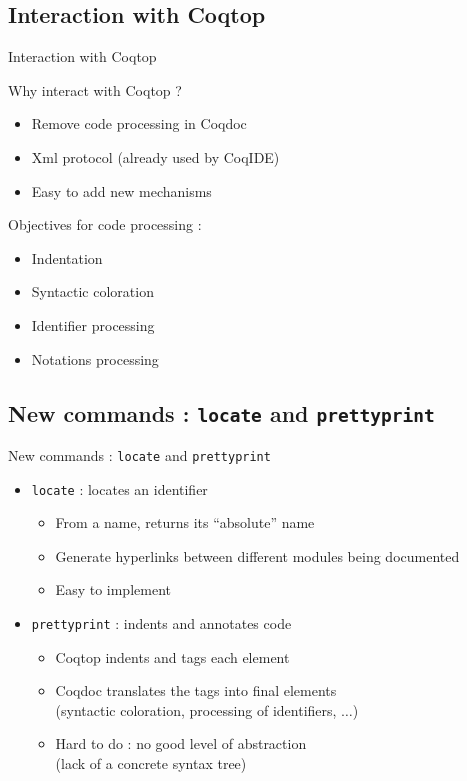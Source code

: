 \documentclass[compress]{beamer}
\newenvironment{tframe}[1]{
  \subsection{#1}
  \begin{frame}{#1}
  }{
  \end{frame}
  }
\begin{document}
  \begin{tframe}{Interaction with Coqtop}
    Why interact with Coqtop ?
    \begin{itemize}
      \item Remove code processing in Coqdoc
      \item Xml protocol (already used by CoqIDE)
      \item Easy to add new mechanisms
    \end{itemize}
    \vfill
    Objectives for code processing :
    \begin{itemize}
      \item Indentation
      \item Syntactic coloration
      \item Identifier processing
      \item Notations processing %
    \end{itemize}
  \end{tframe}

  \begin{tframe}{New commands : \texttt{locate} and \texttt{prettyprint}}
    \begin{itemize}
      \item \texttt{locate} : locates an identifier
        \begin{itemize}
          \item From a name, returns its ``absolute'' name
          \item Generate hyperlinks between different modules being documented
          \item Easy to implement
        \end{itemize}
        \vfill
      \item \texttt{prettyprint} : indents and annotates code
        \begin{itemize}
          \item Coqtop indents and tags each element
          \item Coqdoc translates the tags into final elements \\
            \small (syntactic coloration, processing of identifiers, $\ldots$)
          \item Hard to do : no good level of abstraction \\
            \small (lack of a concrete syntax tree)
        \end{itemize}
    \end{itemize}
  \end{tframe}
\end{document}
